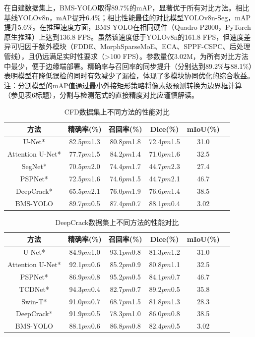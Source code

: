 \documentclass[twocolumn]{sn-jnl}
\begin{document}
	在自建数据集上，BMS-YOLO取得89.7\%的mAP，显著优于所有对比方法。相比基线YOLOv8n，mAP提升6.4\%；相比性能最佳的对比模型YOLOv8n-Seg，mAP提升5.6\%。在推理速度方面，BMS-YOLO在相同硬件（Quadro P2000，PyTorch原生推理）上达到136.8 FPS。虽然该速度低于YOLOv8n的161.8 FPS，但速度差异可归因于额外模块（FDDE、MorphSparseMoE、ECA、SPPF-CSPC、后处理管线），且仍远满足实时性要求（>100 FPS）。参数量仅3.02M，为所有对比方法中最少，便于边缘端部署。精确率与召回率的同步提升（分别达到89.2\%与88.1\%）表明模型在降低误检的同时有效减少了漏检，体现了多模块协同优化的综合收益。注：分割模型的mAP值通过最小外接矩形策略将像素级预测转换为边界框计算（参见表6标题），分割与检测范式的直接精度对比应谨慎解读。
	
	\begin{table}[htbp]
		\centering
		\caption{CFD数据集上不同方法的性能对比}
		\begin{tabular}{cccccc}
			\toprule
			方法 & 精确率(\%) & 召回率(\%) & Dice(\%) & mIoU(\%) \\
			\midrule
			U-Net* & 82.5$pm$1.3 & 80.8$pm$1.8 & 72.4$pm$1.5 & 31.0 \\
			Attention U-Net* & 77.7$pm$1.5 & 84.2$pm$1.4 & 71.0$pm$1.6 & 32.5 \\
			SegNet* & 70.5$pm$2.0 & 74.4$pm$1.7 & 44.7$pm$2.3 & 27.4 \\
			PSPNet* & 72.5$pm$1.6 & 74.6$pm$1.5 & 44.7$pm$2.1 & 46.7 \\
			DeepCrack* & 65.5$pm$2.1 & 76.0$pm$1.9 & 76.6$pm$1.4 & 38.5 \\
			BMS-YOLO & 89.7$pm$0.5 & 87.4$pm$0.7 & 88.1$pm$0.4 & 3.02 \\
			\bottomrule
		\end{tabular}
		\label{tab:compare_cfd}
	\end{table}
	
	\begin{table}[htbp]
		\centering
		\caption{DeepCrack数据集上不同方法的性能对比}
		\begin{tabular}{cccccc}
			\toprule
			方法 & 精确率(\%) & 召回率(\%) & Dice(\%) & mIoU(\%) \\
			\midrule
			U-Net* & 84.9$pm$1.0 & 93.1$pm$0.8 & 81.3$pm$1.2 & 31.0 \\
			Attention U-Net* & 92.1$pm$0.6 & 85.2$pm$0.9 & 80.8$pm$1.1 & 32.5 \\
			PSPNet* & 86.9$pm$0.8 & 95.2$pm$0.5 & 84.1$pm$0.7 & 46.7 \\
			TCDNet* & 94.3$pm$0.4 & 82.7$pm$0.7 & 89.2$pm$0.5 & 35.8 \\
			Swin-T* & 91.0$pm$0.7 & 68.7$pm$1.5 & 81.8$pm$1.3 & 28.3 \\
			DeepCrack* & 91.9$pm$0.5 & 78.3$pm$1.0 & 86.0$pm$0.8 & 38.5 \\
			BMS-YOLO & 88.1$pm$0.6 & 86.8$pm$0.8 & 82.4$pm$0.5 & 3.02 \\
			\bottomrule
		\end{tabular}
		\label{tab:compare_deepcrack}
	\end{table}
	
\end{document}
